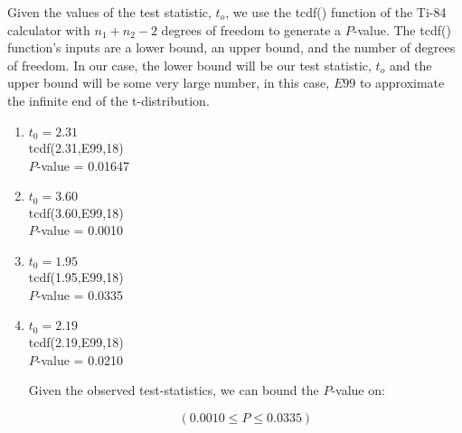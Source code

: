 \documentclass[../main.tex]{subfiles}
\begin{document}
Given the values of the test statistic, \(t_o\), we use the tcdf() function of the Ti-84 calculator with \(n_1 + n_2 -2\) degrees of freedom to generate a $P$-value.
The tcdf() function's inputs are a lower bound, an upper bound, and the number of degrees of freedom. In our case, the lower bound will be our test statistic, \(t_o\) and the upper bound will be some very large number, in this case, \(E99\) to approximate the infinite end of the t-distribution.
\begin{enumerate}[label = (\alph*)]

    \item \(t_0 = 2.31\) \\
        tcdf(2.31,E99,18)\\
        $P$-value = 0.01647

    \item \(t_0 = 3.60\)\\
        tcdf(3.60,E99,18)\\
        $P$-value = 0.0010

    \item \(t_0 = 1.95\)\\
        tcdf(1.95,E99,18)\\
        $P$-value = 0.0335

    \item \(t_0 = 2.19\)\\
        tcdf(2.19,E99,18)\\
        $P$-value = 0.0210
        
    Given the observed test-statistics, we can bound the $P$-value on:
    
    \[\left({0.0010 \le P \le 0.0335}\right)\]
\end{enumerate}
\end{document}
